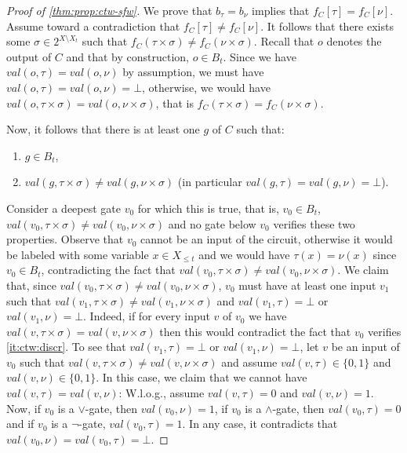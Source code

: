 \documentclass[a4paper,UKenglish,cleveref, autoref, thm-restate]{lipics-v2021}
\newcommand{\guy}[1]{\todo[color=purple]{\color{white}{{\bf Guy}: #1}}}
\begin{document}
\begin{toappendix}
\begin{proof}[Proof of \cref{thm:prop:ctw-sfw}]
  We prove that $b_\tau = b_\nu$ implies that $f_C[\tau] = f_C[\nu]$. Assume toward a contradiction that $f_C[\tau] \ne f_C[\nu]$. It follows that there exists some $\sigma \in 2^{X \setminus X_t}$ such that $f_C(\tau \times \sigma) \neq f_C(\nu \times \sigma)$. Recall that $o$ denotes the output of $C$ and that by construction, $o \in B_t$. Since we have $val(o,\tau) = val(o,\nu)$ by assumption, we must have $val(o,\tau) = val(o,\nu)=\bot$, otherwise, we would have $val(o,\tau \times \sigma) = val(o,\nu \times \sigma)$, that is $f_C(\tau \times \sigma) = f_C(\nu \times \sigma)$.

  Now, it follows that there is at least one $g$ of $C$ such that:
  \begin{enumerate}
  \item \label{it:ctw:inbag} $g \in B_t$, 
  \item \label{it:ctw:discr} $val(g,\tau \times \sigma) \neq val(g,\nu \times \sigma)$ (in particular $val(g,\tau)=val(g,\nu)=\bot$).
  \end{enumerate}
  
  Consider a deepest gate $v_0$ for which this is true, that is, $v_0 \in B_t$, $val(v_0,\tau \times \sigma) \neq val(v_0,\nu \times \sigma)$ and no gate below $v_0$ verifies these two properties. Observe that $v_0$ cannot be an input of the circuit, otherwise it would be labeled with some variable $x \in X_{\leq t}$ and we would have $\tau(x) = \nu(x)$ since $v_0 \in B_t$, contradicting the fact that $val(v_0,\tau \times \sigma) \neq val(v_0,\nu \times \sigma)$. We claim that, since $val(v_0,\tau \times \sigma) \neq val(v_0,\nu \times \sigma)$, $v_0$ must have at least one input $v_1$ such that $val(v_1,\tau \times \sigma) \neq val(v_1,\nu \times \sigma)$ and $val(v_1,\tau) = \bot$ or $val(v_1,\nu)=\bot$. Indeed, if for every input $v$ of $v_0$ we have $val(v,\tau \times \sigma) = val(v,\nu \times \sigma)$ then this would contradict the fact that $v_0$ verifies \cref{it:ctw:discr}. To see that $val(v_1,\tau) = \bot$ or $val(v_1,\nu)=\bot$, let $v$ be an input of $v_0$ such that $val(v,\tau \times \sigma) \neq val(v,\nu \times \sigma)$ and assume $val(v,\tau) \in \{0,1\}$ and $val(v,\nu) \in \{0,1\}$. In this case, we claim that we cannot have $val(v,\tau)=val(v,\nu)$: W.l.o.g., assume $val(v,\tau)=0$ and $val(v,\nu)=1$.
  Now, if  $v_0$ is a $\vee$-gate, then $val(v_0,\nu) = 1$, if $v_0$ is a $\wedge$-gate, then $val(v_0,\tau) = 0$ and if $v_0$ is a $\neg$-gate, $val(v_0,\tau)=1$. In any case, it contradicts that $val(v_0,\nu)=val(v_0,\tau)=\bot$.%


\end{proof}
\end{toappendix}
\end{document}
